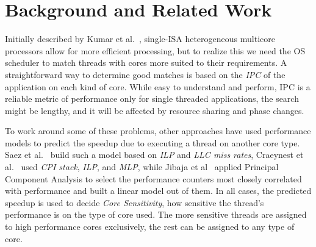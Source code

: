 \section{Background and Related Work}
\label{rw}

\begin{table}
  \caption{Qualitative Analysis on Related Work}
  \center
  \label{rwt}
\end{table}

Initially described by Kumar et al.~\cite{kumar2004single,kumar2003single}, single-ISA heterogeneous multicore processors allow for more efficient processing, but to realize this we need the OS scheduler to match threads with cores more suited to their requirements. A straightforward way to determine good matches is based on the \emph{IPC} of the application on each kind of core. While easy to understand and perform, IPC is a reliable metric of performance only for single threaded applications, the search might be lengthy, and it will be affected by resource sharing and phase changes.

To work around some of these problems, other approaches have used performance models to predict the speedup due to executing a thread on another core type. Saez et al.~\cite{saez2012leveraging} build such a model based on \emph{ILP} and \emph{LLC miss rates}, Craeynest et al.~\cite{van2012scheduling} used \emph{CPI stack}, \emph{ILP}, and \emph{MLP}, while Jibaja et al~\cite{jibaja2016portable} applied Principal Component Analysis to select the performance counters most closely correlated with performance and built a linear model out of them. In all cases, the predicted speedup is used to decide \emph{Core Sensitivity}, how sensitive the thread's performance is on the type of core used. The more sensitive threads are assigned to high performance cores exclusively, the rest can be assigned to any type of core.

